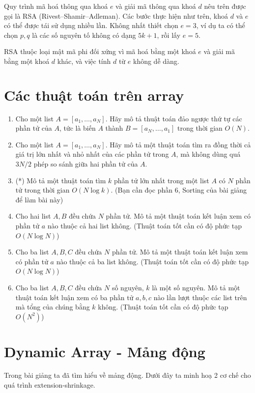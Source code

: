 \documentclass{article}
\begin{document}
Quy trình mã hoá thông qua khoá $e$ và giải mã thông qua khoá $d$ nêu trên được gọi là RSA (Rivest–Shamir–Adleman). Các bước thực hiện như trên, khoá $d$ và $e$ có thể được tái sử dụng nhiều lần. Không nhất thiết chọn $e=3$, ví dụ ta có thể chọn $p, q$ là các số nguyên tố không có dạng $5k +1$, rồi lấy $e=5$.

RSA thuộc loại mật mã phi đối xứng vì mã hoá bằng một khoá $e$ và giải mã bằng một khoá $d$ khác, và việc tính $d$ từ $e$ không dễ dàng.

\section{Các thuật toán trên array}

\begin{em}
    \begin{enumerate}
        \item Cho một list $A = [a_1, \ldots, a_N]$. Hãy mô tả thuật toán đảo ngược thứ tự các phần tử của $A$, tức là biến $A$ thành $B = [a_N, \ldots, a_1]$ trong thời gian $O(N)$.
        \item Cho một list $A = [a_1, \ldots, a_N]$. Hãy mô tả một thuật toán tìm ra đồng thời cả giá trị lớn nhất và nhỏ nhất của các phần tử trong $A$, mà không dùng quá $3N/2$ phép so sánh giữa hai phần tử của $A$.
        \item (*) Mô tả một thuật toán tìm $k$ phần tử lớn nhất trong một list $A$ có $N$ phần tử trong thời gian $O(N\log k)$. (Bạn cần đọc phần 6, Sorting của bài giảng để làm bài này)
        \item Cho hai list $A, B$ đều chứa $N$ phần tử. Mô tả một thuật toán kết luận xem có phần tử $a$ nào thuộc cả hai list không. (Thuật toán tốt cần có độ phức tạp $O(N \log N)$)
        \item Cho ba list $A, B, C$ đều chứa $N$ phần tử. Mô tả một thuật toán kết luận xem có phần tử $a$ nào thuộc cả ba list không. (Thuật toán tốt cần có độ phức tạp $O(N \log N)$)
        \item Cho ba list $A, B, C$ đều chứa $N$ số nguyên, $k$ là một số nguyên. Mô tả một thuật toán kết luận xem có ba phần tử $a, b, c$ nào lần lượt thuộc các list trên mà tổng của chúng bằng $k$ không. (Thuật toán tốt cần có độ phức tạp $O(N^2)$)
    \end{enumerate}
\end{em}


\section{Dynamic Array - Mảng động}
Trong bài giảng ta đã tìm hiểu về mảng động. Dưới đây ta minh hoạ 2 cơ chế cho quá trình extension-shrinkage.
\end{document}
